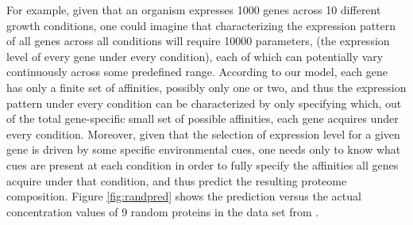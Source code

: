 For example, given that an organism expresses 1000 genes across 10 different growth conditions, one could imagine that characterizing the expression pattern of all genes across all conditions will require 10000 parameters, (the expression level of every gene under every condition), each of which can potentially vary continuously across some predefined range.
According to our model, each gene has only a finite set of affinities, possibly only one or two, and thus the expression pattern under every condition can be characterized by only specifying which, out of the total gene-specific small set of possible affinities, each gene acquires under every condition.
Moreover, given that the selection of expression level for a given gene is driven by some specific environmental cues, one needs only to know what cues are present at each condition in order to fully specify the affinities all genes acquire under that condition, and thus predict the resulting proteome composition.
Figure \ref{fig:randpred} shows the prediction versus the actual concentration values of 9 random proteins in the data set from \cite{Heinemann2015}.
